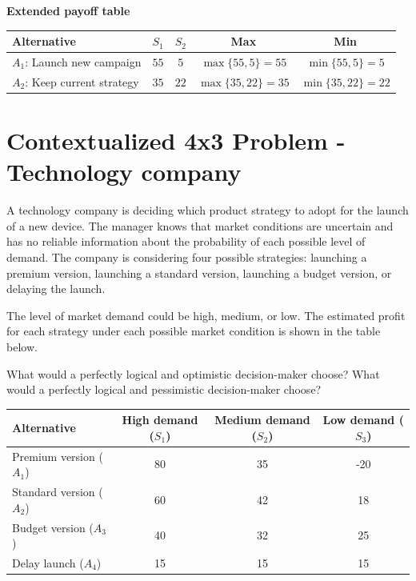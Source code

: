 	\textbf{Extended payoff table}
	
	\begin{center}
		\small
		\renewcommand{\arraystretch}{1.5}
		\setlength{\tabcolsep}{4pt}
		
		\begin{tabular}{lcccc}
			\toprule
			Alternative & $S_1$ & $S_2$ & Max & Min \\
			\midrule
			
			$A_1$: Launch new campaign
			& $55$
			& $5$
			& $\max\{55,5\}=55$
			& $\min\{55,5\}=5$
			\\
			
			$A_2$: Keep current strategy
			& $35$
			& $22$
			& $\max\{35,22\}=35$
			& $\min\{35,22\}=22$
			\\
			
			\bottomrule
		\end{tabular}
	\end{center}
	
	
	\section{Contextualized 4x3 Problem - Technology company}
	
	A technology company is deciding which product strategy to adopt for the launch of a new device. The manager knows that market conditions are uncertain and has no reliable information about the probability of each possible level of demand. The company is considering four possible strategies: launching a premium version, launching a standard version, launching a budget version, or delaying the launch.
	
	The level of market demand could be high, medium, or low. The estimated profit for each strategy under each possible market condition is shown in the table below.
	
	What would a perfectly logical and optimistic decision-maker choose? What would a perfectly logical and pessimistic decision-maker choose?
	
	\begin{center}
		\renewcommand{\arraystretch}{1.3}
		\begin{tabular}{lccc}
			\toprule
			Alternative & High demand ($S_1$) & Medium demand ($S_2$) & Low demand ($S_3$) \\
			\midrule
			Premium version ($A_1$) & 80 & 35 & -20 \\
			Standard version ($A_2$) & 60 & 42 & 18 \\
			Budget version ($A_3$) & 40 & 32 & 25 \\
			Delay launch ($A_4$) & 15 & 15 & 15 \\
			\bottomrule
		\end{tabular}
	\end{center}
	

